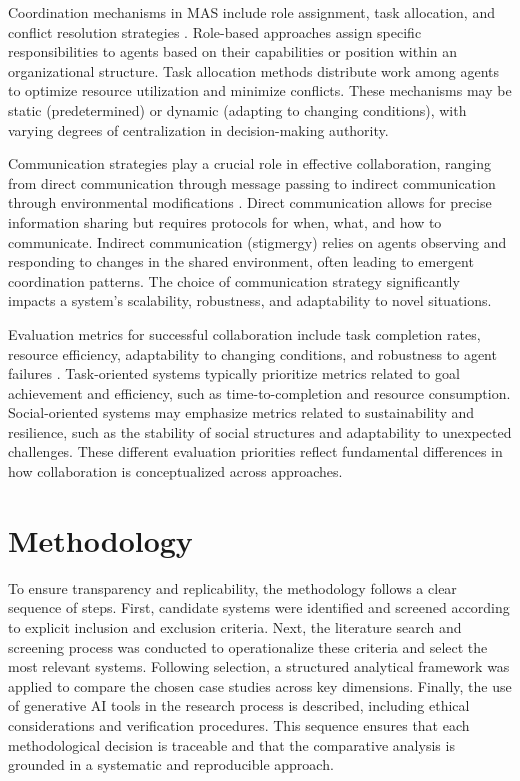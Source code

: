 \documentclass[a4paper, 12pt]{article}
\begin{document}
Coordination mechanisms in MAS include role assignment, task allocation, and conflict resolution strategies \autocite{dong2024villageragentgraphbasedmultiagentframework,shu2024effectivegenaimultiagentcollaboration}. Role-based approaches assign specific responsibilities to agents based on their capabilities or position within an organizational structure. Task allocation methods distribute work among agents to optimize resource utilization and minimize conflicts. These mechanisms may be static (predetermined) or dynamic (adapting to changing conditions), with varying degrees of centralization in decision-making authority.

Communication strategies play a crucial role in effective collaboration, ranging from direct communication through message passing to indirect communication through environmental modifications \autocite{shu2024effectivegenaimultiagentcollaboration,qiu2024collaborativeintelligencepropagatingintentions}. Direct communication allows for precise information sharing but requires protocols for when, what, and how to communicate. Indirect communication (stigmergy) relies on agents observing and responding to changes in the shared environment, often leading to emergent coordination patterns. The choice of communication strategy significantly impacts a system's scalability, robustness, and adaptability to novel situations.

Evaluation metrics for successful collaboration include task completion rates, resource efficiency, adaptability to changing conditions, and robustness to agent failures \autocite{shu2024effectivegenaimultiagentcollaboration,qiu2024collaborativeintelligencepropagatingintentions, chen2024sagentsselforganizingagentsopenended}. Task-oriented systems typically prioritize metrics related to goal achievement and efficiency, such as time-to-completion and resource consumption. Social-oriented systems may emphasize metrics related to sustainability and resilience, such as the stability of social structures and adaptability to unexpected challenges. These different evaluation priorities reflect fundamental differences in how collaboration is conceptualized across approaches.

\section{Methodology}

To ensure transparency and replicability, the methodology follows a clear sequence of steps. First, candidate systems were identified and screened according to explicit inclusion and exclusion criteria. Next, the literature search and screening process was conducted to operationalize these criteria and select the most relevant systems. Following selection, a structured analytical framework was applied to compare the chosen case studies across key dimensions. Finally, the use of generative AI tools in the research process is described, including ethical considerations and verification procedures. This sequence ensures that each methodological decision is traceable and that the comparative analysis is grounded in a systematic and reproducible approach.
\end{document}

